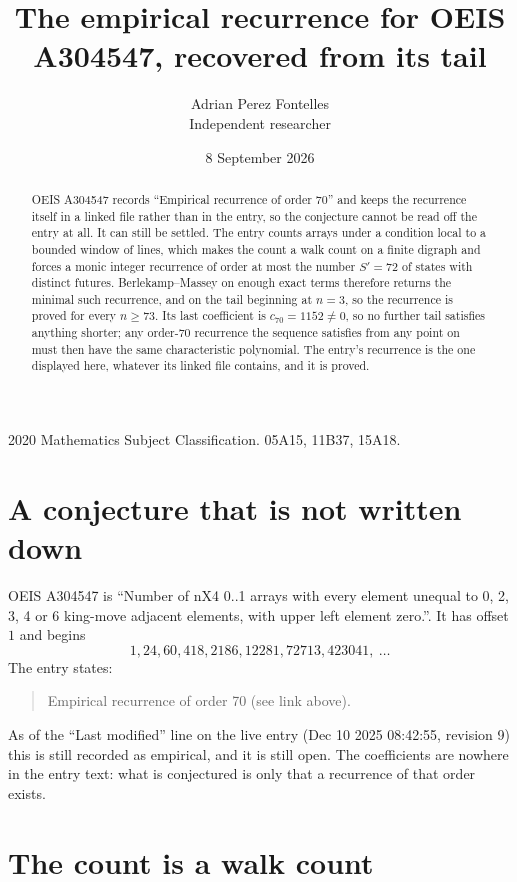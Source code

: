 \documentclass[11pt,a4paper]{article}
\title{The empirical recurrence for OEIS A304547, recovered from its tail}
\author{Adrian Perez Fontelles\\ \small Independent researcher}
\date{8 September 2026}
\theoremstyle{plain}
\theoremstyle{definition}
\begin{document}
\maketitle

\begin{abstract}
OEIS A304547 records ``Empirical recurrence of order $70$'' and keeps the recurrence itself in
a linked file rather than in the entry, so the conjecture cannot be read off the entry at all.
It can still be settled. The entry counts arrays under a condition local to a bounded window of
lines, which makes the count a walk count on a finite digraph and forces a monic integer
recurrence of order at most the number $S'=72$ of states with distinct futures. Berlekamp--Massey on
enough exact terms therefore returns the minimal such recurrence, and on the tail beginning at $n=3$, so the recurrence is proved for every $n\ge73$.
Its last coefficient is $c_{70}=1152\neq0$, so no further tail satisfies anything
shorter; any order-$70$ recurrence the sequence satisfies from any point on must then have
the same characteristic polynomial. The entry's recurrence is the one displayed here, whatever
its linked file contains, and it is proved.
\end{abstract}

\noindent\small 2020 Mathematics Subject Classification. 05A15, 11B37, 15A18.\normalsize

\section{A conjecture that is not written down}

OEIS A304547 is ``Number of nX4 0..1 arrays with every element unequal to 0, 2, 3, 4 or 6 king-move adjacent elements, with upper left element zero.''. It has offset $1$ and begins
\[
1, 24, 60, 418, 2186, 12281, 72713, 423041,\ \dots
\]
The entry states:
\begin{quote}
Empirical recurrence of order 70 (see link above).
\end{quote}
As of the ``Last modified'' line on the live entry (Dec 10 2025 08:42:55, revision 9)
this is still recorded as empirical, and it is still open. The coefficients are nowhere in the
entry text: what is conjectured is only that a recurrence of that order exists.

\section{The count is a walk count}
\end{document}
